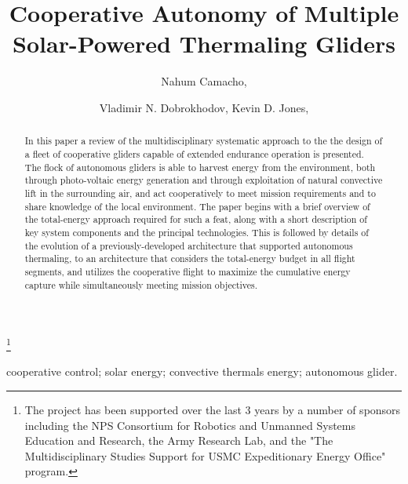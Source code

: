 \documentclass{ifacconf}
\begin{document}
\begin{frontmatter}

\title{Cooperative Autonomy of Multiple Solar-Powered Thermaling Gliders }

\thanks[footnoteinfo]{The project has been supported over the last 3 years by a number of sponsors
including the NPS Consortium for Robotics and Unmanned Systems Education and Research, the Army
Research Lab, and the "The Multidisciplinary Studies Support for USMC Expeditionary Energy Office"
program.}

\author[First]{Nahum Camacho,}
\author[Second]{Vladimir N. Dobrokhodov, Kevin D. Jones,}

\address[First]{Graduate student at the Department  of Mechanical and Aerospace Engineering, Naval
Postgraduate School, Monterey, CA 93943 USA (e-mail: ncamacho@nps.edu)}
\address[Second]{Research Associate Professors at the Department  of Mechanical and Aerospace
Engineering, Naval Postgraduate School, Monterey, CA 93943 USA (e-mail: {vndobrok, kdjones}@nps.edu)}


\begin{keyword}                           %
cooperative control; solar energy; convective thermals energy; autonomous glider.
\end{keyword}                             %


\begin{abstract}                          %
In this paper a review of the multidisciplinary systematic approach to the
the design of a fleet of cooperative gliders capable of extended endurance
operation is presented. The flock of autonomous gliders is able to harvest
energy from the environment, both through photo-voltaic energy generation
and through exploitation of natural convective lift in the surrounding air,
and act cooperatively to meet mission requirements and to share knowledge
of the local environment. The paper begins with a brief overview of the
total-energy approach required for such a feat, along with a short
description of key system components and the principal technologies. This
is followed by details of the evolution of a previously-developed
architecture that supported autonomous thermaling, to an architecture that
considers the total-energy budget in all flight segments, and utilizes the
cooperative flight to maximize the cumulative energy capture while
simultaneously meeting mission objectives.
\end{abstract}

\end{frontmatter}
\end{document}
